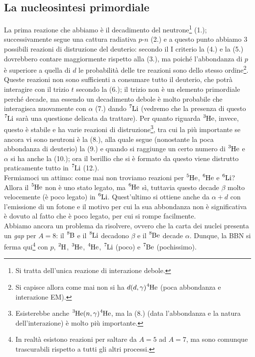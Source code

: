 \subsection{La nucleosintesi primordiale}\label{sec-nuc-prim}
La prima reazione che abbiamo è il decadimento del neutrone\footnote{Si tratta dell'unica reazione di interazione debole.} (1.); successivamente segue una cattura radiativa $p$-$n$ (2.) e a questo punto abbiamo 3 possibili reazioni di distruzione del deuterio: secondo il I criterio la (4.) e la (5.) dovrebbero contare maggiormente rispetto alla (3.), ma poiché l'abbondanza di $p$ è superiore a quella di $d$ le probabilità delle tre reazioni sono dello stesso ordine\footnote{Si capisce allora come mai non si ha $d(d,\gamma)\ce{^4He}$ (poca abbondanza e interazione EM).}. Queste reazioni non sono sufficienti a consumare tutto il deuterio, che potrà interagire con il trizio $t$ secondo la (6.); il trizio non è un elemento primordiale perché decade, ma essendo un decadimento debole è molto probabile che interagisca nuovamente con $\alpha$ (7.) dando $\ce{^7Li}$ (vedremo che la presenza di questo $\ce{^7Li}$ sarà una questione delicata da trattare).
Per quanto riguarda $\ce{^3He}$, invece, questo è stabile e ha varie reazioni di distruzione\footnote{Esisterebbe anche $\ce{^3He}(n,\gamma)\ce{^4He}$, ma la (8.) (data l'abbondanza e la natura dell'interazione) è molto più importante.}, tra cui la più importante se ancora vi sono neutroni è la (8.), alla quale segue (nonostante la poca abbondanza di deuterio) la (9.) e quando si raggiunge un certo numero di $\ce{^3He}$ e $\alpha$ si ha anche la (10.); ora il berillio che si è formato da questo viene distrutto praticamente tutto in $\ce{^7Li}$ (12.).\\
Fermiamoci un attimo: come mai non troviamo reazioni per $\ce{^5He}$, $\ce{^6He}$ e $\ce{^6Li}$? Allora il $\ce{^5He}$ non è uno stato legato, ma $\ce{^6He}$ sì, tuttavia questo decade $\beta$ molto velocemente (è poco legato) in $\ce{^6Li}$. Quest'ultimo si ottiene anche da $\alpha + d$ con l'emissione di un fotone e il motivo per cui la sua abbondanza non è significativa è dovuto al fatto che è poco legato, per cui si rompe facilmente.\\
Abbiamo ancora un problema da risolvere, ovvero che la carta dei nuclei presenta un \textit{gap} per $A=8$: il $\ce{^8B}$ e il $\ce{^8Li}$ decadono $\beta$ e il $\ce{^8Be}$ decade $\alpha$. Dunque, la BBN si ferma qui\footnote{In realtà esistono reazioni per saltare da $A=5$ ad $A=7$, ma sono comunque trascurabili rispetto a tutti gli altri processi.} con $p$, $\ce{^2H}$, $\ce{^3He}$, $\ce{^4He}$, $\ce{^7Li}$ (poco) e $\ce{^7Be}$ (pochissimo).

